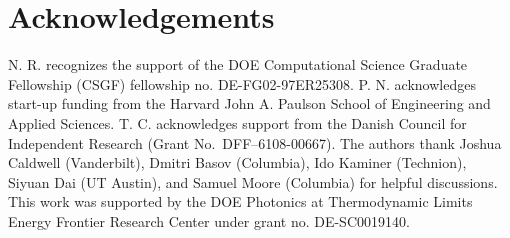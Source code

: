 \documentclass[aps,prb,twocolumn,
	groupedaddress,superscriptaddress,
	amsfonts,amssymb,amsmath,floatfix,
	citeautoscript]{revtex4-1}
\begin{document}
%

\section{Acknowledgements}
N. R. recognizes the support of the DOE Computational Science Graduate Fellowship (CSGF) fellowship no. DE-FG02-97ER25308. P. N. acknowledges start-up funding from the Harvard John A. Paulson School of Engineering and Applied Sciences. T. C. acknowledges support from the Danish Council for Independent Research (Grant No.\ DFF--6108-00667). The authors thank Joshua Caldwell (Vanderbilt), Dmitri Basov (Columbia), Ido Kaminer (Technion), Siyuan Dai (UT Austin), and Samuel Moore (Columbia) for helpful discussions. This work was supported by the DOE Photonics at Thermodynamic Limits Energy Frontier Research Center under grant no. DE-SC0019140.



\end{document}
